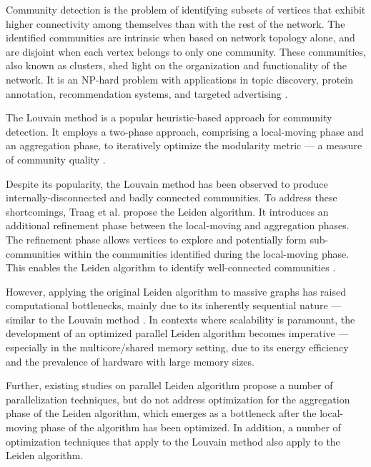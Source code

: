 Community detection is the problem of identifying subsets of vertices that exhibit higher connectivity among themselves than with the rest of the network. The identified communities are intrinsic when based on network topology alone, and are disjoint when each vertex belongs to only one community. These communities, also known as clusters, shed light on the organization and functionality of the network. It is an NP-hard problem with applications in topic discovery, protein annotation, recommendation systems, and targeted advertising \cite{com-gregory10}. The Louvain method \cite{com-blondel08} is a popular heuristic-based approach for community detection. It employs a two-phase approach, comprising a local-moving phase and an aggregation phase, to iteratively optimize the modularity metric --- a measure of community quality \cite{com-newman06}.

Despite its popularity, the Louvain method has been observed to produce internally-disconnected and badly connected communities. To address these shortcomings, Traag et al. \cite{com-traag19} propose the Leiden algorithm. It introduces an additional refinement phase between the local-moving and aggregation phases. The refinement phase allows vertices to explore and potentially form sub-communities within the communities identified during the local-moving phase. This enables the Leiden algorithm to identify well-connected communities \cite{com-traag19}.

However, applying the original Leiden algorithm to massive graphs has raised computational bottlenecks, mainly due to its inherently sequential nature --- similar to the Louvain method \cite{com-halappanavar17}. In contexts where scalability is paramount, the development of an optimized parallel Leiden algorithm becomes imperative --- especially in the multicore/shared memory setting, due to its energy efficiency and the prevalence of hardware with large memory sizes. Further, existing studies on parallel Leiden algorithm \cite{verweijfaster, nguyenleiden} propose a number of parallelization techniques, but do not address optimization for the aggregation phase of the Leiden algorithm, which emerges as a bottleneck after the local-moving phase of the algorithm has been optimized. In addition, a number of optimization techniques that apply to the Louvain method also apply to the Leiden algorithm.




